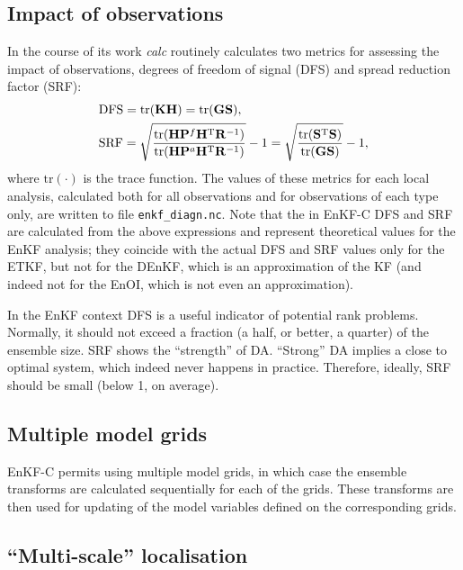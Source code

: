 \documentclass[11pt]{report}
\newcommand{\mb} {\mathbf}
\newcommand{\T}{^{\tiny \mathrm T}}
\begin{document}
\subsection{Impact of observations}
\label{sec:impact}

In the course of its work \emph{calc} routinely calculates two metrics for assessing the impact of observations, degrees of freedom of signal (DFS) and spread reduction factor (SRF):
\begin{align*}
  & \mathrm{DFS} = \mathrm{tr}(\mb K \mb H) = \mathrm{tr}(\mb G \mb S), \\
  & \mathrm{SRF} = \sqrt{\frac{\mathrm{tr}(\mb H \mb P^f \mb H\T \mb R^{-1})}{\mathrm{tr}(\mb H \mb P^a \mb H\T \mb R^{-1})}} - 1 = \sqrt{\frac{\mathrm{tr}(\mb S\T \mb S)}{\mathrm{tr}(\mb G \mb S)}} - 1,
\end{align*}
where $\mathrm{tr}(\cdot)$ is the trace function.
The values of these metrics for each local analysis, calculated both for all observations and for observations of each type only, are written to file \verb|enkf_diagn.nc|.
Note that the in EnKF-C DFS and SRF are calculated from the above expressions and represent theoretical values for the EnKF analysis; they coincide with the actual DFS and SRF values only for the ETKF, but not for the DEnKF, which is an approximation of the KF (and indeed not for the EnOI, which is not even an approximation).

In the EnKF context DFS is a useful indicator of potential rank problems.
Normally, it should not exceed a fraction (a half, or better, a quarter) of the ensemble size.
SRF shows the ``strength'' of DA.
``Strong'' DA implies a close to optimal system, which indeed never happens in practice.
Therefore, ideally, SRF should be small (below 1, on average).

\subsection{Multiple model grids}

EnKF-C permits using multiple model grids, in which case the ensemble transforms are calculated sequentially for each of the grids.
These transforms are then used for updating of the model variables defined on the corresponding grids.

\subsection {``Multi-scale'' localisation}
\end{document}
